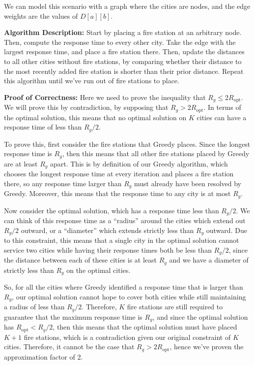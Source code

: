 \documentclass[11pt]{article}
\begin{document}
\begin{solution}
	We can model this scenario with a graph where the cities are nodes, and the edge weights are the values 
	of $D[a][b]$. 

	\textbf{Algorithm Description:} Start by placing a fire station at an arbitrary node. Then, compute 
	the response time to every other city. Take the edge with the largest response time, and place a fire 
	station there. Then, update the distances to all other cities without fire stations, by comparing whether 
	their distance to the most recently added fire station is shorter than their prior distance. Repeat
	this algorithm until we've run out of fire stations to place. 
	
	\textbf{Proof of Correctness:} Here we need to prove the inequality that $R_g \le 2R_{\text{opt}}$. We 
	will prove this by contradiction, by supposing that $R_g > 2R_{\text{opt}}$. In terms of the optimal 
	solution, this means that no optimal solution on $K$ cities can have a response time of less than $R_g / 2$.

	To prove this, first consider the fire stations that Greedy places. Since the longest 
	response time is $R_g$, then this means that all other fire stations placed by Greedy are at least 
	$R_g$ apart. This is by definition of our Greedy algorithm, which chooses the longest response time 
	at every iteration and places a fire station there, so any response time larger than $R_g$ must already 
	have been resolved by Greedy. Moreover, this means that the response time to any city 
	is at most $R_g$.

	Now consider the optimal solution, which has a response time less than $R_g / 2$. We can think of this 
	response time as a ``radius'' around the cities which extend out $R_g /2$ outward, or a ``diameter'' 
	which extends strictly less than $R_g$ outward.
	Due to this constraint, this 
	means that a single city in the optimal solution cannot service two cities while having their 
	response times both be less than $R_g / 2$, since the distance between each of these cities is at least 
	$R_g$ and we have a diameter of strictly less than $R_g$ on the optimal cities. 

	So, for all the cities where Greedy identified a response time that is larger than $R_g$, our 
	optimal solution cannot hope to cover both cities while still maintaining a radius of less than $R_g/2$. 
	Therefore, $K$ fire stations are still required to guarantee that the maximum response time is $R_g$, and since 
	the optimal solution has $R_{\text{opt}} < R_g / 2$, then this means that the optimal solution must have 
	placed $K+1$ fire stations, which is a contradiction given our original constraint of $K$ cities. Therefore, 
	it cannot be the case that $R_g > 2R_{\text{opt}}$, hence we've proven the approximation factor of 2. 
	

\end{solution}
\end{document}
